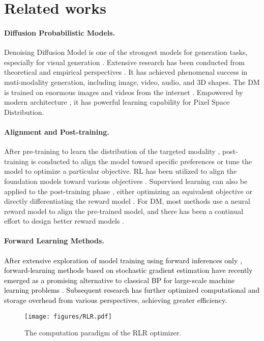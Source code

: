 \section{Related works}
\paragraph{Diffusion Probabilistic Models.} Denoising Diffusion Model \cite{ddpm} is one of the strongest models for generation tasks, especially for visual generation \cite{LDM, DiT, videocrafter2}. Extensive research has been conducted from theoretical and empirical perspectives \cite{ddim, EDM, score_sde}. It has achieved phenomenal success in muti-modality generation, including image, video, audio, and 3D shapes. The DM is trained on enormous images and videos from the internet \cite{frozen_in_time, wang2023internvid_viclip, schuhmann2022laion}. Empowered by modern architecture \cite{transformer}, it has powerful learning capability for Pixel Space Distribution. 

\paragraph{Alignment and Post-training.} After pre-training to learn the distribution of the targeted modality \cite{achiam2023gpt4, scaling_neural_LM}, post-training is conducted to align the model toward specific preferences or tune the model to optimize a particular objective. RL has been utilized to align the foundation models toward various objectives \cite{RLHF, RLHF_blog, ddpo}. Supervised learning can also be applied to the post-training phase \cite{DPO}, either optimizing an equivalent objective \cite{diffusion_dpo} or directly differentiating the reward model \cite{draft, alignprop, vader}. For DM, most methods use a neural reward model to align the pre-trained model, and there has been a continual effort to design better reward models \cite{he2024videoscore, xu2024visionreward, imagereward}.

\paragraph{Forward Learning Methods.} 
\textcolor{black}{After extensive exploration of model training using forward inferences only \citep[see, e.g.,][]{peng2022new, hinton2022forward}, forward-learning methods \cite{salimans2017evolution, mezo, deepzero, oneforward} based on stochastic gradient estimation have recently emerged as a promising alternative to classical BP for large-scale machine learning problems \cite{HiZOO, revisi_ZO}. Subsequent research \cite{ren2024flops, chen2024enhancing} has further optimized computational and storage overhead from various perspectives, achieving greater efficiency.}


\begin{figure*}[!th]
    \centering
    \texttt{[image: figures/RLR.pdf]}
    \vspace{-0.5cm}
    \caption{The computation paradigm of the RLR optimizer.}
    \label{fig:algdiagram}
    \vspace{-0.3cm}
\end{figure*}